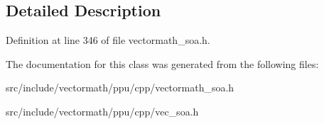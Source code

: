 \subsection{Detailed Description}


Definition at line 346 of file vectormath\-\_\-soa.\-h.



The documentation for this class was generated from the following files\-:\begin{DoxyCompactItemize}
\item 
src/include/vectormath/ppu/cpp/vectormath\-\_\-soa.\-h\item 
src/include/vectormath/ppu/cpp/vec\-\_\-soa.\-h\end{DoxyCompactItemize}
